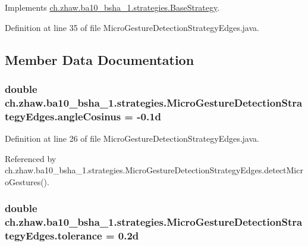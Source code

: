 Implements \hyperlink{classch_1_1zhaw_1_1ba10__bsha__1_1_1strategies_1_1BaseStrategy_af6ea27835befac71906915236a347450}{ch.zhaw.ba10\_\-bsha\_\-1.strategies.BaseStrategy}.

Definition at line 35 of file MicroGestureDetectionStrategyEdges.java.

\subsection{Member Data Documentation}
\hypertarget{classch_1_1zhaw_1_1ba10__bsha__1_1_1strategies_1_1MicroGestureDetectionStrategyEdges_a2490c2e49516999b5b3f9da8a9a6b8ba}{
\subsubsection[{angleCosinus}]{\setlength{\rightskip}{0pt plus 5cm}double {\bf ch.zhaw.ba10\_\-bsha\_\-1.strategies.MicroGestureDetectionStrategyEdges.angleCosinus} = -\/0.1d}}
\label{classch_1_1zhaw_1_1ba10__bsha__1_1_1strategies_1_1MicroGestureDetectionStrategyEdges_a2490c2e49516999b5b3f9da8a9a6b8ba}


Definition at line 26 of file MicroGestureDetectionStrategyEdges.java.

Referenced by ch.zhaw.ba10\_\-bsha\_\-1.strategies.MicroGestureDetectionStrategyEdges.detectMicroGestures().\hypertarget{classch_1_1zhaw_1_1ba10__bsha__1_1_1strategies_1_1MicroGestureDetectionStrategyEdges_a17536b25d63e07e0c5c776e017a4b29c}{
\subsubsection[{tolerance}]{\setlength{\rightskip}{0pt plus 5cm}double {\bf ch.zhaw.ba10\_\-bsha\_\-1.strategies.MicroGestureDetectionStrategyEdges.tolerance} = 0.2d}}
\label{classch_1_1zhaw_1_1ba10__bsha__1_1_1strategies_1_1MicroGestureDetectionStrategyEdges_a17536b25d63e07e0c5c776e017a4b29c}


